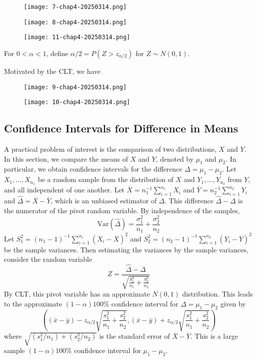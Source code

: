 \begin{figure}[H]
\centering
\texttt{[image: 7-chap4-20250314.png]}
\label{}
\end{figure}

\begin{figure}[H]
\centering
\texttt{[image: 8-chap4-20250314.png]}
\label{}
\end{figure}

\begin{figure}[H]
\centering
\texttt{[image: 11-chap4-20250314.png]}
\label{}
\end{figure}

For $0<\alpha<1$, define $\alpha/2=P(Z>z_{\alpha/2 })$ for $Z\sim N(0,1)$.

Motivated by the CLT, we have
\begin{figure}[H]
\centering
\texttt{[image: 9-chap4-20250314.png]}
\label{}
\end{figure}

\begin{figure}[H]
\centering
\texttt{[image: 10-chap4-20250314.png]}
\label{}
\end{figure}

\subsection{Confidence Intervals for Difference in Means}

A practical problem of interest is the comparison of two distributions, $X$ and $Y$. In this section, we compare the means of $X$ and $Y$, denoted by $\mu_1$ and $\mu_2$. In particular, we obtain confidence intervals for the difference $\Delta=\mu_1-\mu_2$. Let $X_1,\dots,X_{n_1}$ be a random sample from the distribution of $X$ and $Y_1,\dots,Y_{n_2}$ from $Y$, and all independent of one another. Let $\overline{X}=n_1 ^{-1}\sum_{i=1}^{n_1}X_i$ and $\overline{Y}=n_2^{-1}\sum_{i=1}^{n_2}Y_i$ and $\widehat{\Delta}=\overline{X}-\overline{Y}$, which is an unbiased estimator of $\Delta$. This difference $\widehat{\Delta}-\Delta$ is the numerator of the pivot random variable. By independence of the samples,
\[
\mathrm{Var}(\widehat{\Delta})=\frac{\sigma_1^{2}}{n_1}+\frac{\sigma_2^{2}}{n_2}
\]
Let $S_1^{2}=(n_1-1)^{-1}\sum_{i=1}^{n_1}(X_i-\overline{X})^{2}$ and $S_2^{2}=(n_2-1)^{-1}\sum_{i=1}^{n_2}(Y_i-\overline{Y})^{2}$ be the sample variances. Then estimating the variances by the sample variances, consider the random variable
\[
Z=\frac{\widehat{\Delta}-\Delta}{\sqrt{ \frac{S_1^{2}}{n_1} +\frac{S_2^{2}}{n_2}}}
\]
By CLT, this pivot variable has an approximate $N(0,1)$ distribution. This leads to the approximate $(1-\alpha) 100\%$ confidence interval for $\Delta=\mu_1-\mu_2$ given by
\[
\left( (\overline{x}-\overline{y})-z_{\alpha/2}\sqrt{ \frac{s_1^{2}}{n_1}+\frac{s_2^{2}}{n_2} }, (\overline{x}-\overline{y})+z_{\alpha/2}\sqrt{ \frac{s_1^{2}}{n_1}+\frac{s_2^{2}}{n_2} }\right)
\]
where $\sqrt{ (s_1^{2}/n_1)+(s_2^{2}/n_2) }$ is the standard error of $\overline{X}-\overline{Y}$. This is a large sample $(1-\alpha) 100\%$ confidence interval for $\mu_1-\mu_2$.

